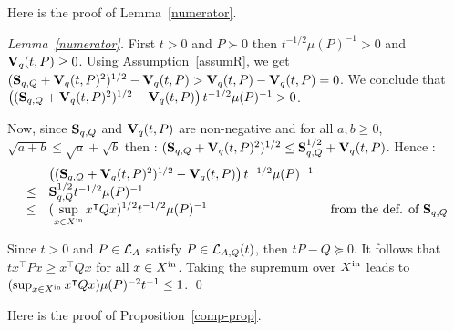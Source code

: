 \documentclass[10pt]{llncs}
\begin{document}
Here is the proof of Lemma~\ref{numerator}.

\begin{proof}[Lemma~\ref{numerator}]
First $t>0$ and $P\succ 0$ then $t^{-1/2}\mu(P)^{-1}>0$ and $\mathbf{V}_{q}(t,P)\geq 0$. Using Assumption~\ref{assumR}, we get $(\mathbf{S}_{q,Q}+\mathbf{V}_{q}(t,P)^2)^{1/2}-\mathbf{V}_{q}(t,P)> \mathbf{V}_{q}(t,P)-\mathbf{V}_{q}(t,P)=0$. We conclude that $\left((\mathbf{S}_{q,Q}+\mathbf{V}_{q}(t,P)^2)^{1/2}-\mathbf{V}_{q}(t,P)\right) t^{-1/2}\mu(P)^{-1}>0$. 

Now, since $\mathbf{S}_{q,Q}$ and $\mathbf{V}_{q}(t,P)$ are non-negative and for all $a,b\geq 0$, $\sqrt{a+b}\leq \sqrt{a}+\sqrt{b}$  then : 
$(\mathbf{S}_{q,Q}+\mathbf{V}_{q}(t,P)^2)^{1/2}\leq \mathbf{S}_{q,Q}^{1/2}+\mathbf{V}_{q}(t,P)$. Hence : 
\[
\begin{array}{lll}
&\left((\mathbf{S}_{q,Q}+\mathbf{V}_{q}(t,P)^2)^{1/2}-\mathbf{V}_{q}(t,P)\right) t^{-1/2}\mu(P)^{-1}& \\
\leq &\mathbf{S}_{q,Q}^{1/2} t^{-1/2}\mu(P)^{-1} & \\
\leq &(\displaystyle{\sup_{x\in X^\mathrm{in}} x^\intercal Q x})^{1/2} t^{-1/2}\mu(P)^{-1} & \text{ from the def. of } \mathbf{S}_{q,Q}
\end{array}
\]

Since $t>0$ and $P\in\mathcal{L}_{A}$ satisfy $P\in\mathcal{L}_{A,Q}(t)$, then $t P-Q\succeq 0$. It follows that 
$t x^\intercal P x\geq x^\intercal Q x$ for all $x\in X^\mathrm{in}$. Taking the supremum over $X^\mathrm{in}$ leads to $(\sup_{x\in X^\mathrm{in}} x^\intercal Q x)\mu(P)^{-2}t^{-1} \leq 1$. 
\qed
\end{proof}

Here is the proof of Proposition~\ref{comp-prop}.
\end{document}
